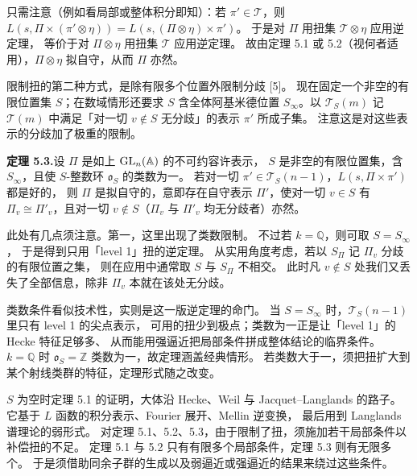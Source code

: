 只需注意（例如看局部或整体积分即知）：若 $\pi'\in\mathcal{T}$，则
$L(s,\Pi\times(\pi'\otimes\eta))=L(s,(\Pi\otimes\eta)\times\pi')$。
于是对 $\Pi$ 用扭集 $\mathcal{T}\otimes\eta$ 应用逆定理，
等价于对 $\Pi\otimes\eta$ 用扭集 $\mathcal{T}$ 应用逆定理。
故由定理 5.1 或 5.2（视何者适用），$\Pi\otimes\eta$ 拟自守，从而 $\Pi$ 亦然。

限制扭的第二种方式，是除有限多个位置外限制分歧 [5]。
现在固定一个非空的有限位置集 $S$；在数域情形还要求 $S$ 含全体阿基米德位置
$S_\infty$。以 $\mathcal{T}_S(m)$ 记 $\mathcal{T}(m)$ 中满足「对一切 $v\notin S$
无分歧」的表示 $\pi'$ 所成子集。
注意这是对这些表示的分歧加了极重的限制。

\textbf{定理 5.3.}\quad 设 $\Pi$ 是如上 $\mathrm{GL}_n(\mathbb{A})$ 的不可约容许表示，
$S$ 是非空的有限位置集，含 $S_\infty$，且使 $S$-整数环 $\mathfrak{o}_S$ 的类数为一。
若对一切 $\pi'\in\mathcal{T}_S(n-1)$，$L(s,\Pi\times\pi')$ 都是好的，
则 $\Pi$ 是拟自守的，意即存在自守表示 $\Pi'$，使对一切 $v\in S$ 有
$\Pi_v\cong\Pi'_v$，且对一切 $v\notin S$（$\Pi_v$ 与 $\Pi'_v$ 均无分歧者）亦然。

此处有几点须注意。第一，这里出现了类数限制。
不过若 $k=\mathbb{Q}$，则可取 $S=S_\infty$，
于是得到只用「level 1」扭的逆定理。
从实用角度考虑，若以 $S_\Pi$ 记 $\Pi_v$ 分歧的有限位置之集，
则在应用中通常取 $S$ 与 $S_\Pi$ 不相交。
此时凡 $v\notin S$ 处我们又丢失了全部信息，除非 $\Pi_v$ 本就在该处无分歧。
\begin{annote}
类数条件看似技术性，实则是这一版逆定理的命门。
当 $S=S_\infty$ 时，$\mathcal{T}_S(n-1)$ 里只有 level 1 的尖点表示，
可用的扭少到极点；类数为一正是让「level 1」的 Hecke 特征足够多、
从而能用强逼近把局部条件拼成整体结论的临界条件。
$k=\mathbb{Q}$ 时 $\mathfrak{o}_S=\mathbb{Z}$ 类数为一，故定理涵盖经典情形。
若类数大于一，须把扭扩大到某个射线类群的特征，定理形式随之改变。
\par{}
\end{annote}

$S$ 为空时定理 5.1 的证明，大体沿 Hecke、Weil 与 Jacquet--Langlands 的路子。
它基于 $L$ 函数的积分表示、Fourier 展开、Mellin 逆变换，
最后用到 Langlands 谱理论的弱形式。
对定理 5.1、5.2、5.3，由于限制了扭，须施加若干局部条件以补偿扭的不足。
定理 5.1 与 5.2 只有有限多个局部条件，定理 5.3 则有无限多个。
于是须借助同余子群的生成以及弱逼近或强逼近的结果来绕过这些条件。

